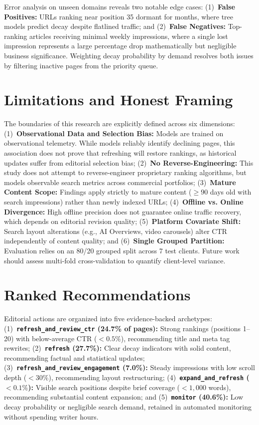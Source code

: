\documentclass[conference]{IEEEtran}
\begin{document}
Error analysis on unseen domains reveals two notable edge cases: (1)~\textbf{False Positives:} URLs ranking near position 35 dormant for months, where tree models predict decay despite flatlined traffic; and (2)~\textbf{False Negatives:} Top-ranking articles receiving minimal weekly impressions, where a single lost impression represents a large percentage drop mathematically but negligible business significance. Weighting decay probability by demand resolves both issues by filtering inactive pages from the priority queue.

\section{Limitations and Honest Framing}
The boundaries of this research are explicitly defined across six dimensions:
(1)~\textbf{Observational Data and Selection Bias:} Models are trained on observational telemetry. While models reliably identify declining pages, this association does not prove that refreshing will restore rankings, as historical updates suffer from editorial selection bias;
(2)~\textbf{No Reverse-Engineering:} This study does not attempt to reverse-engineer proprietary ranking algorithms, but models observable search metrics across commercial portfolios;
(3)~\textbf{Mature Content Scope:} Findings apply strictly to mature content ($\ge 90$ days old with search impressions) rather than newly indexed URLs;
(4)~\textbf{Offline vs. Online Divergence:} High offline precision does not guarantee online traffic recovery, which depends on editorial revision quality;
(5)~\textbf{Platform Covariate Shift:} Search layout alterations (e.g., AI Overviews, video carousels) alter CTR independently of content quality; and
(6)~\textbf{Single Grouped Partition:} Evaluation relies on an 80/20 grouped split across 7 test clients. Future work should assess multi-fold cross-validation to quantify client-level variance.

\section{Ranked Recommendations}
Editorial actions are organized into five evidence-backed archetypes:
(1)~\textbf{\texttt{refresh\_and\_review\_ctr} (24.7\% of pages):} Strong rankings (positions 1--20) with below-average CTR ($<0.5\%$), recommending title and meta tag rewrites;
(2)~\textbf{\texttt{refresh} (27.7\%):} Clear decay indicators with solid content, recommending factual and statistical updates;
(3)~\textbf{\texttt{refresh\_and\_review\_engagement} (7.0\%):} Steady impressions with low scroll depth ($<30\%$), recommending layout restructuring;
(4)~\textbf{\texttt{expand\_and\_refresh} ($<0.1\%$):} Visible search positions despite brief coverage ($<1,000$ words), recommending substantial content expansion; and
(5)~\textbf{\texttt{monitor} (40.6\%):} Low decay probability or negligible search demand, retained in automated monitoring without spending writer hours.
\end{document}
